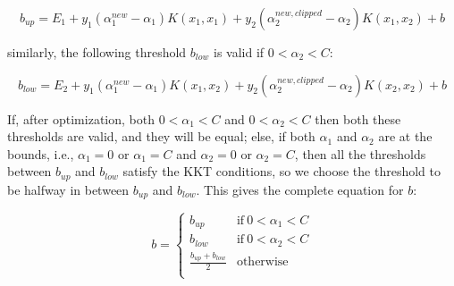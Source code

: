 \begin{equation} \label{eq:smo_svc_b1}
	b_{up} = E_1 + y_1 (\alpha_1^{new} - \alpha_1) K(x_1,x_1) + y_2 (\alpha_2^{new,clipped} - \alpha_2) K(x_1,x_2) + b
\end{equation}

similarly, the following threshold $b_{low}$ is valid if $0 < \alpha_2 < C$:

\begin{equation} \label{eq:smo_svc_b2}
	b_{low} = E_2 + y_1 (\alpha_1^{new} - \alpha_1) K(x_1,x_2) + y_2 (\alpha_2^{new,clipped} - \alpha_2) K(x_2,x_2) + b
\end{equation}

If, after optimization, both $0 < \alpha_1 < C$ and $0 < \alpha_2 < C$ then both these thresholds are valid, and they will be equal; else, if both $\alpha_1$ and $\alpha_2$ are at the bounds, i.e., $\alpha_1 = 0$ or $\alpha_1 = C$ and $\alpha_2 = 0$ or $\alpha_2 = C$, then all the thresholds between $b_{up}$ and $b_{low}$ satisfy the KKT conditions, so we choose the threshold to be halfway in between $b_{up}$ and $b_{low}$. This gives the complete equation for $b$:

\begin{equation} \label{eq:smo_svc_b}
	b =
        \begin{cases}
            b_{up} & \text{if} \ 0 < \alpha_1 < C \\
            b_{low} & \text{if} \ 0 < \alpha_2 < C \\
            \displaystyle \frac{b_{up}+b_{low}}{2} & \text{otherwise} \\
        \end{cases}
\end{equation}

\newpage

